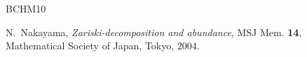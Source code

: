 \documentclass[12pt]{amsart}
\theoremstyle{definition}
\begin{document}
\begin{thebibliography}{BCHM10}











N.~Nakayama, {\em Zariski-decomposition and abundance}, MSJ Mem. {\textbf{14}}, Mathematical Society of Japan, Tokyo, 2004. 








\end{thebibliography}
\end{document}
